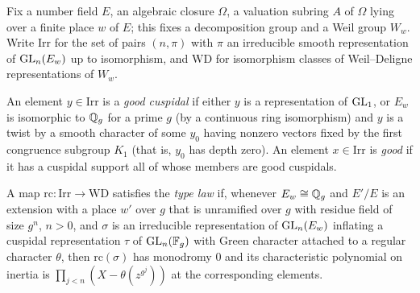 Fix a number field $E$, an algebraic closure $\Omega$, a valuation subring $A$ of $\Omega$ lying over a finite place $w$ of $E$; this fixes a decomposition group and a Weil group $W_w$. Write $\mathrm{Irr}$ for the set of pairs $(n,\pi)$ with $\pi$ an irreducible smooth representation of $\mathrm{GL}_n(E_w)$ up to isomorphism, and $\mathrm{WD}$ for isomorphism classes of Weil--Deligne representations of $W_w$.

\begin{definition}\label{fam:good}
An element $y\in\mathrm{Irr}$ is a \emph{good cuspidal} if either $y$ is a representation of $\mathrm{GL}_1$, or $E_w$ is isomorphic to $\mathbb{Q}_g$ for a prime $g$ (by a continuous ring isomorphism) and $y$ is a twist by a smooth character of some $y_0$ having nonzero vectors fixed by the first congruence subgroup $K_1$ (that is, $y_0$ has depth zero). An element $x\in\mathrm{Irr}$ is \emph{good} if it has a cuspidal support all of whose members are good cuspidals.
\end{definition}

\begin{definition}\label{fam:type-law}
A map $\mathrm{rc}\colon\mathrm{Irr}\to\mathrm{WD}$ satisfies the \emph{type law} if, whenever $E_w\cong\mathbb{Q}_g$ and $E'/E$ is an extension with a place $w'$ over $g$ that is unramified over $g$ with residue field of size $g^n$, $n>0$, and $\sigma$ is an irreducible representation of $\mathrm{GL}_n(E_w)$ inflating a cuspidal representation $\tau$ of $\mathrm{GL}_n(\mathbb{F}_g)$ with Green character attached to a regular character $\theta$, then $\mathrm{rc}(\sigma)$ has monodromy $0$ and its characteristic polynomial on inertia is $\prod_{j<n}(X-\theta(z^{g^j}))$ at the corresponding elements.
\end{definition}

